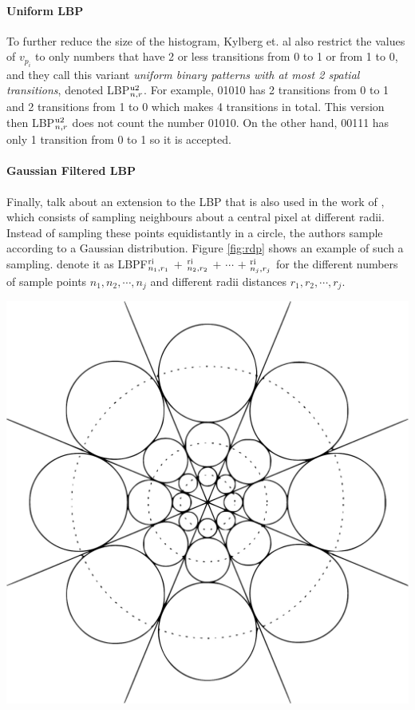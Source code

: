 \begin{multicols}{2}
\paragraph{Uniform LBP} To further reduce the size of the histogram, Kylberg et. al also restrict the values of $v_{p_i}$ to only numbers that have 2 or less transitions from 0 to 1 or from 1 to 0, and they call this variant \emph{uniform binary patterns with at most 2 spatial transitions}, denoted LBP$^{\textnormal{u2}}_{n,r}$. For example, 01010 has 2 transitions from 0 to 1 and 2 transitions from 1 to 0 which makes 4 transitions in total. This version then LBP$^{\textnormal{u2}}_{n,r}$ does not count the number 01010. On the other hand, 00111 has only 1 transition from 0 to 1 so it is accepted. 
\par 
\paragraph{Gaussian Filtered LBP} Finally, \citet{maenpaa2003multi} talk about an extension to the LBP that is also used in the work of \citet{kylberg2011virus}, which consists of sampling neighbours about a central pixel at different radii. Instead of sampling these points equidistantly in a circle, the authors sample according to a Gaussian distribution. Figure \ref{fig:rdp} shows an example of such a sampling. \citet{kylberg2011virus} denote it as LBPF$^{\textnormal{ri}}_{n_1,r_1}$ $+$ $^{\textnormal{ri}}_{n_2,r_2}$ $+$ $\cdots$ $+$ $^{\textnormal{ri}}_{n_j,r_j}$ for the different numbers of sample points $n_1, n_2, \cdots, n_j$ and different radii distances $r_1, r_2, \cdots, r_j$.
\begin{Figure}
	\centering
	\includegraphics[width=0.5\linewidth]{images/lbpf.pdf}
	\label{fig:lbpf}
\end{Figure}

\end{multicols}
